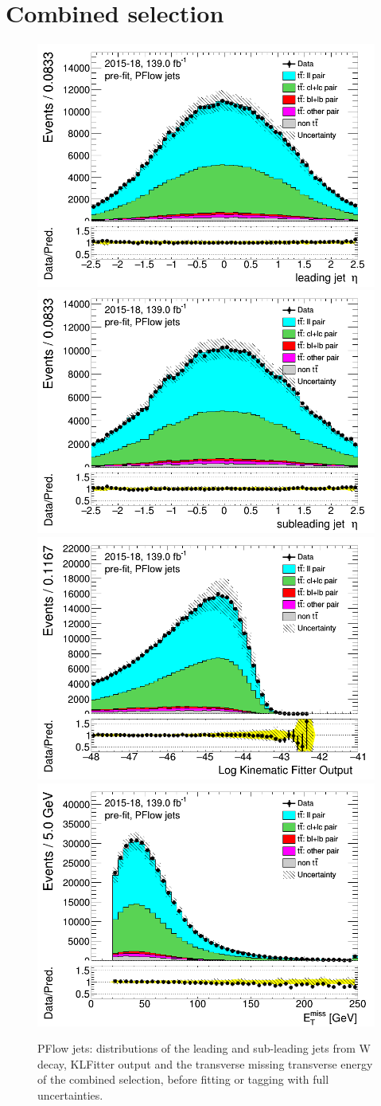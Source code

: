 	

	\newpage
	\section{Combined selection}
	\label{sec:appendix_combined_selection}
	\newpage	
	\begin{figure}[H]
	\includegraphics[width=.45\textwidth]{FTAG_plots/pretagNoRwwithhighpTPFlowall/DataMC_h_J0_eta.png}
	\includegraphics[width=.45\textwidth]{FTAG_plots/pretagNoRwwithhighpTPFlowall/DataMC_h_J1_eta.png}\\
	\includegraphics[width=.45\textwidth]{FTAG_plots/pretagNoRwwithhighpTPFlowall/DataMC_h_LLR.png}
	\includegraphics[width=.45\textwidth]{FTAG_plots/pretagNoRwwithhighpTPFlowall/DataMC_h_MET.png}\\
	
	\caption{PFlow jets: distributions of the leading and sub-leading jets 
	from W decay, KLFitter output and the transverse missing transverse 
	energy of the combined selection, before fitting or tagging with 
	full uncertainties.} \label{fig:combined_jets_PFlow}
	\end{figure}
	
